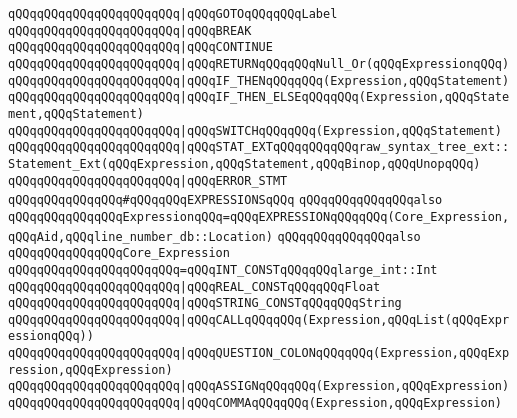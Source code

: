 \verb|qQQqqQQqqQQqqQQqqQQqqQQq|\verb#|qQQqGOTOqQQqqQQqLabel#\newline
\verb|qQQqqQQqqQQqqQQqqQQqqQQq|\verb#|qQQqBREAK#\newline
\verb|qQQqqQQqqQQqqQQqqQQqqQQq|\verb#|qQQqCONTINUE#\newline
\verb|qQQqqQQqqQQqqQQqqQQqqQQq|\verb#|qQQqRETURNqQQqqQQqNull_Or(qQQqExpressionqQQq)#\newline
\verb|qQQqqQQqqQQqqQQqqQQqqQQq|\verb#|qQQqIF_THENqQQqqQQq(Expression,qQQqStatement)#\newline
\verb|qQQqqQQqqQQqqQQqqQQqqQQq|\verb#|qQQqIF_THEN_ELSEqQQqqQQq(Expression,qQQqStatement,qQQqStatement)#\newline
\verb|qQQqqQQqqQQqqQQqqQQqqQQq|\verb#|qQQqSWITCHqQQqqQQq(Expression,qQQqStatement)#\newline
\verb|qQQqqQQqqQQqqQQqqQQqqQQq|\verb#|qQQqSTAT_EXTqQQqqQQqqQQqraw_syntax_tree_ext::Statement_Ext(qQQqExpression,qQQqStatement,qQQqBinop,qQQqUnopqQQq)#\newline
\verb|qQQqqQQqqQQqqQQqqQQqqQQq|\verb#|qQQqERROR_STMT#\newline
\newline
\verb|qQQqqQQqqQQqqQQq#qQQqqQQqEXPRESSIONSqQQq|\newline
\newline
\verb|qQQqqQQqqQQqqQQqalso|\newline
\verb|qQQqqQQqqQQqqQQqExpressionqQQq=qQQqEXPRESSIONqQQqqQQq(Core_Expression,qQQqAid,qQQqline_number_db::Location)|\newline
\newline
\verb|qQQqqQQqqQQqqQQqalso|\newline
\verb|qQQqqQQqqQQqqQQqCore_Expression|\newline
\verb|qQQqqQQqqQQqqQQqqQQqqQQq=qQQqINT_CONSTqQQqqQQqlarge_int::Int|\newline
\verb|qQQqqQQqqQQqqQQqqQQqqQQq|\verb#|qQQqREAL_CONSTqQQqqQQqFloat#\newline
\verb|qQQqqQQqqQQqqQQqqQQqqQQq|\verb#|qQQqSTRING_CONSTqQQqqQQqString#\newline
\verb|qQQqqQQqqQQqqQQqqQQqqQQq|\verb#|qQQqCALLqQQqqQQq(Expression,qQQqList(qQQqExpressionqQQq))#\newline
\verb|qQQqqQQqqQQqqQQqqQQqqQQq|\verb#|qQQqQUESTION_COLONqQQqqQQq(Expression,qQQqExpression,qQQqExpression)#\newline
\verb|qQQqqQQqqQQqqQQqqQQqqQQq|\verb#|qQQqASSIGNqQQqqQQq(Expression,qQQqExpression)#\newline
\verb|qQQqqQQqqQQqqQQqqQQqqQQq|\verb#|qQQqCOMMAqQQqqQQq(Expression,qQQqExpression)#\newline
